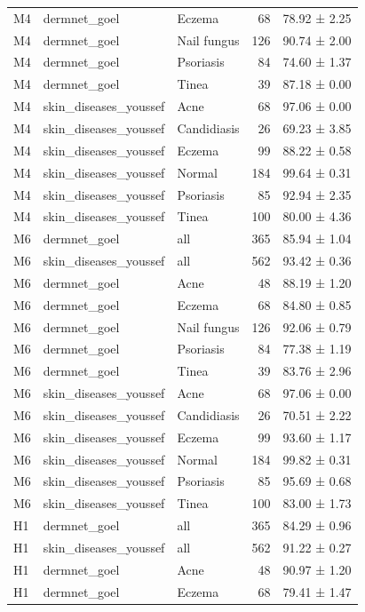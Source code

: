 \begin{tabular}{lllrl}
M4 & dermnet\_goel & Eczema & 68 & 78.92 ± 2.25 \\
M4 & dermnet\_goel & Nail fungus & 126 & 90.74 ± 2.00 \\
M4 & dermnet\_goel & Psoriasis & 84 & 74.60 ± 1.37 \\
M4 & dermnet\_goel & Tinea & 39 & 87.18 ± 0.00 \\
M4 & skin\_diseases\_youssef & Acne & 68 & 97.06 ± 0.00 \\
M4 & skin\_diseases\_youssef & Candidiasis & 26 & 69.23 ± 3.85 \\
M4 & skin\_diseases\_youssef & Eczema & 99 & 88.22 ± 0.58 \\
M4 & skin\_diseases\_youssef & Normal & 184 & 99.64 ± 0.31 \\
M4 & skin\_diseases\_youssef & Psoriasis & 85 & 92.94 ± 2.35 \\
M4 & skin\_diseases\_youssef & Tinea & 100 & 80.00 ± 4.36 \\
M6 & dermnet\_goel & all & 365 & 85.94 ± 1.04 \\
M6 & skin\_diseases\_youssef & all & 562 & 93.42 ± 0.36 \\
M6 & dermnet\_goel & Acne & 48 & 88.19 ± 1.20 \\
M6 & dermnet\_goel & Eczema & 68 & 84.80 ± 0.85 \\
M6 & dermnet\_goel & Nail fungus & 126 & 92.06 ± 0.79 \\
M6 & dermnet\_goel & Psoriasis & 84 & 77.38 ± 1.19 \\
M6 & dermnet\_goel & Tinea & 39 & 83.76 ± 2.96 \\
M6 & skin\_diseases\_youssef & Acne & 68 & 97.06 ± 0.00 \\
M6 & skin\_diseases\_youssef & Candidiasis & 26 & 70.51 ± 2.22 \\
M6 & skin\_diseases\_youssef & Eczema & 99 & 93.60 ± 1.17 \\
M6 & skin\_diseases\_youssef & Normal & 184 & 99.82 ± 0.31 \\
M6 & skin\_diseases\_youssef & Psoriasis & 85 & 95.69 ± 0.68 \\
M6 & skin\_diseases\_youssef & Tinea & 100 & 83.00 ± 1.73 \\
H1 & dermnet\_goel & all & 365 & 84.29 ± 0.96 \\
H1 & skin\_diseases\_youssef & all & 562 & 91.22 ± 0.27 \\
H1 & dermnet\_goel & Acne & 48 & 90.97 ± 1.20 \\
H1 & dermnet\_goel & Eczema & 68 & 79.41 ± 1.47 \\

\end{tabular}
